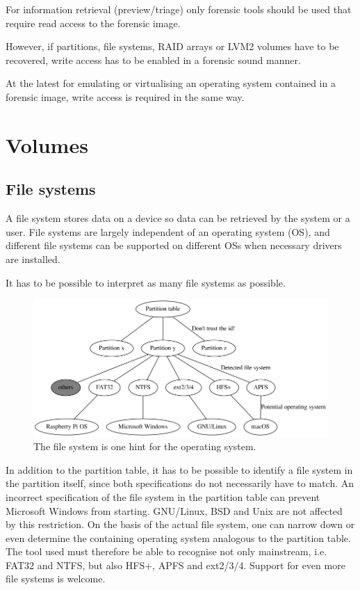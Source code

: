 For information retrieval (preview/triage) only forensic tools should be used that require read access to the forensic image.

However, if partitions, file systems, RAID arrays or LVM2 volumes have to be recovered, write access has to be enabled in a forensic sound manner.

At the latest for emulating or virtualising an operating system contained in a forensic image, write access is required in the same way.

\section{Volumes}
\label{sec:volumes}

\subsection{File systems}

A file system stores data on a device so data can be retrieved by the system or a user. File systems are largely independent of an operating system (OS), and different file systems can be supported on different OSs when necessary drivers are installed. \cite{Aarnes2017:160}

It has to be possible to interpret as many file systems as possible.

\begin{figure}[htbp]  %
  \centering
  \includegraphics[width=.5\textwidth]{figures/fs-vs-os.png}
  \caption[File system and operating system]{The file system is one hint for the operating system.}
  \label{fig:fsandos}
\end{figure}

In addition to the partition table, it has to be possible to identify a file system in the partition itself, since both specifications do not necessarily have to match. An incorrect specification of the file system in the partition table can prevent Microsoft Windows from starting. GNU/Linux, BSD and Unix are not affected by this restriction. On the basis of the actual file system, one can narrow down or even determine the containing operating system analogous to the partition table. The tool used must therefore be able to recognise not only mainstream, i.e. FAT32 and NTFS, but also HFS+, APFS and ext2/3/4. Support for even more file systems is welcome.

